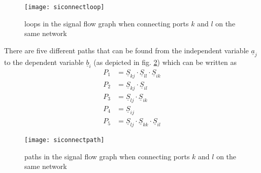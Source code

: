 \begin{figure}[ht]
\begin{center}
\texttt{[image: siconnectloop]}
\end{center}
\caption{loops in the signal flow graph when connecting ports $k$ and $l$ on the same network}
\label{fig:siconnectloop}
\end{figure}
\FloatBarrier

There are five different paths that can be found from the independent
variable $\underline{a}_{j}$ to the dependent variable
$\underline{b}_{i}$ (as depicted in fig. \ref{fig:siconnectpath})
which can be written as
\begin{align}
P_{1} &= \underline{S}_{kj}\cdot \underline{S}_{ll}\cdot \underline{S}_{ik}\\
P_{2} &= \underline{S}_{kj}\cdot \underline{S}_{il}\\
P_{3} &= \underline{S}_{lj}\cdot \underline{S}_{ik}\\
P_{4} &= \underline{S}_{ij}\\
P_{5} &= \underline{S}_{lj}\cdot \underline{S}_{kk}\cdot \underline{S}_{il}
\end{align}

\begin{figure}[ht]
\begin{center}
\texttt{[image: siconnectpath]}
\end{center}
\caption{paths in the signal flow graph when connecting ports $k$ and $l$ on the same network}
\label{fig:siconnectpath}
\end{figure}
\FloatBarrier

